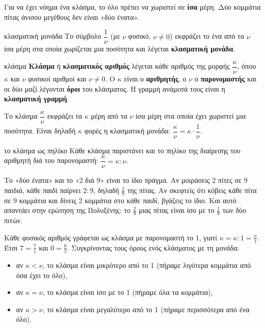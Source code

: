 
Για να έχει νόημα ένα κλάσμα, το όλο πρέπει να χωριστεί σε \textbf{ίσα} μέρη. Δύο κομμάτια πίτας άνισου μεγέθους δεν είναι «δύο ένατα».

\begin{orismos}{κλασματική μονάδα}
Το σύμβολο $\dfrac{1}{\nu}$ (με $\nu$ φυσικό, $\nu\neq 0$) εκφράζει το ένα από τα $\nu$ ίσα μέρη στα οποία χωρίζεται μια ποσότητα και λέγεται \textbf{κλασματική μονάδα}.
\end{orismos}

\begin{orismos}{κλάσμα}
\textbf{Κλάσμα} ή \textbf{κλασματικός αριθμός} λέγεται κάθε αριθμός της μορφής $\dfrac{\kappa}{\nu}$, όπου $\kappa$ και $\nu$ φυσικοί αριθμοί και $\nu\neq 0$. Ο $\kappa$ είναι ο \textbf{αριθμητής}, ο $\nu$ ο \textbf{παρονομαστής} και οι δύο μαζί λέγονται \textbf{όροι} του κλάσματος. Η γραμμή ανάμεσά τους είναι η \textbf{κλασματική γραμμή}.
\end{orismos}

Το κλάσμα $\dfrac{\kappa}{\nu}$ εκφράζει τα $\kappa$ μέρη από τα $\nu$ ίσα μέρη στα οποία έχει χωριστεί μια ποσότητα. Είναι δηλαδή $\kappa$ φορές η κλασματική μονάδα: $\dfrac{\kappa}{\nu}=\kappa\cdot\dfrac{1}{\nu}$.

\begin{idiotita}{το κλάσμα ως πηλίκο}
Κάθε κλάσμα παριστάνει και το πηλίκο της διαίρεσης του αριθμητή διά του παρονομαστή: $\dfrac{\kappa}{\nu}=\kappa:\nu$.
\end{idiotita}

Το «δύο ένατα» και το «2 διά 9» είναι το ίδιο πράγμα. Αν μοιράσεις 2 πίτες σε 9 παιδιά, κάθε παιδί παίρνει $2:9$, δηλαδή $\frac{2}{9}$ της πίτας. Αν σκεφτείς ότι κόβεις κάθε πίτα σε 9 κομμάτια και δίνεις 2 κομμάτια στο κάθε παιδί, βγάζεις το ίδιο. Και αυτό απαντάει στην ερώτηση της Πολυξένης: το $\frac{2}{9}$ μιας πίτας είναι ίσο με το $\frac{1}{9}$ των δύο πιτών.


Κάθε φυσικός αριθμός γράφεται ως κλάσμα με παρονομαστή το 1, γιατί $\kappa=\kappa:1=\frac{\kappa}{1}$. Έτσι $7=\frac{7}{1}$ και $0=\frac{0}{5}$. Συγκρίνοντας τους όρους ενός κλάσματος με τη μονάδα:
\begin{itemize}[leftmargin=1.2em,itemsep=0.2ex,topsep=2pt]
\item αν $\kappa<\nu$, το κλάσμα είναι μικρότερο από το 1 (πήραμε λιγότερα κομμάτια από όσα έχει το όλο),
\item αν $\kappa=\nu$, το κλάσμα είναι ίσο με το 1 (πήραμε όλα τα κομμάτια),
\item αν $\kappa>\nu$, το κλάσμα είναι μεγαλύτερο από το 1 (πήραμε περισσότερα από ένα όλο).
\end{itemize}

